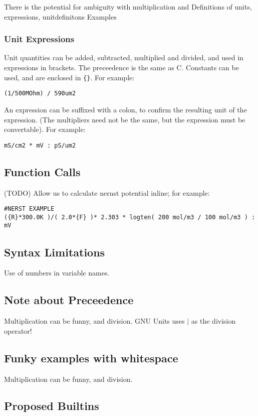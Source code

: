 \documentclass{article}
\begin{document}
There is the potential for ambiguity with multiplication and 
Definitions of units, expressions, unitdefinitons
Examples

\subsubsection*{Unit Expressions}
Unit quantities can be added, subtracted, multiplied and divided, and used in expressions in brackets. The preceedence is the same as C.
Constants can be used, and are enclosed in \verb|{}|.
For example:
\begin{verbatim}
(1/500MOhm) / 590um2

\end{verbatim}

An expression can be suffixed with a colon, to confirm the resulting unit of the expression. (The multipliers need not be the same, but the expression must be convertable). For example:
\begin{verbatim}
mS/cm2 * mV : pS/um2 
\end{verbatim}


\subsection{Function Calls}
(TODO)
Allow us to calculate nernst potential inline; for example:
\begin{verbatim}
#NERST EXAMPLE
({R}*300.0K )/( 2.0*{F} )* 2.303 * logten( 200 mol/m3 / 100 mol/m3 ) : mV
\end{verbatim}


\subsection{Syntax Limitations}
Use of numbers in variable names.

\subsection*{Note about Preceedence}
Multiplication can be funny, and division.
GNU Units uses $|$ as the division operator!

\subsection*{Funky examples with whitespace}
Multiplication can be funny, and division.


\newpage
\subsection{Proposed Builtins}
\end{document}
